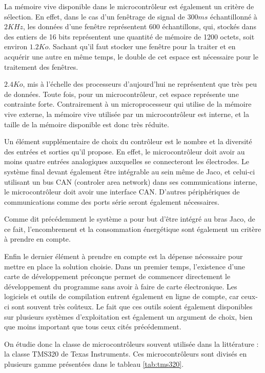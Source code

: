 \documentclass[letterpaper, twoside, 12pt, memoire, creativecommons, hyperref]{thETS}
\begin{document}
La mémoire vive disponible dans le microcontrôleur est également un critère de sélection. En effet, dans le cas d'un fenêtrage de signal de $300 ms$ échantillonné à $2 KHz$, les données  d'une fenêtre représentent 600 échantillons, qui, stockés dans des entiers de 16 bits représentent une quantité de mémoire de 1200 octets, soit environ $1.2 Ko$. Sachant qu'il faut stocker une fenêtre pour la traiter et en acquérir une autre en même temps, le double de cet espace est nécessaire pour le traitement des fenêtres. 

$2.4Ko$, mis à l'échelle des processeurs d'aujourd'hui ne représentent que très peu de données. Toute fois, pour un microcontrôleur, cet espace représente une contrainte forte. Contrairement à un microprocesseur qui utilise de la mémoire vive externe, la mémoire vive utilisée par un microcontrôleur est interne, et la taille de la mémoire disponible est donc très réduite. 

Un élément supplémentaire de choix du contrôleur est le nombre et la diversité des entrées et sorties qu'il propose. En effet, le microcontrôleur doit avoir au moins quatre entrées analogiques auxquelles se connecteront les électrodes. Le système final devant également être intégrable au sein même de Jaco, et celui-ci utilisant un bus CAN (controler area network) dans ses communications interne, le microcontrôleur doit avoir une interface CAN. D'autres périphériques de communications comme des ports série seront également nécessaires. 

Comme dit précédemment le système a pour but d'être intégré au bras Jaco, de ce fait, l'encombrement et la consommation énergétique sont également un critère à prendre en compte.

Enfin le dernier élément à prendre en compte est la dépense nécessaire pour mettre en place la solution choisie. Dans un premier temps, l'existence d'une carte de développement préconçue permet de commencer directement le développement du programme sans avoir à faire de carte électronique. Les logiciels et outils de compilation entrent également en ligne de compte, car ceux-ci sont souvent très coûteux. Le fait que ces outils soient également disponibles sur plusieurs systèmes d'exploitation est également un argument de choix, bien que moins important que tous ceux cités précédemment. 

On étudie donc la classe de microcontrôleurs souvent utilisée dans la littérature : la classe TMS320 de Texas Instruments.
Ces microcontrôleurs sont divisés en plusieurs gamme présentées dans le tableau \ref{tab:tms320}.
\end{document}
